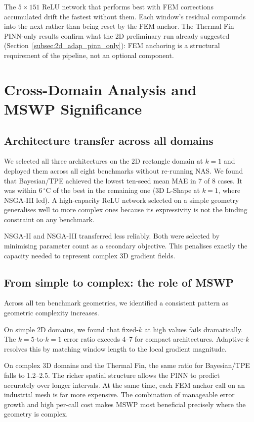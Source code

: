 The $5{\times}151$ ReLU network that performs best with FEM corrections
accumulated drift the fastest without them.
Each window's residual compounds into the next rather than being reset by the
FEM anchor.
The Thermal Fin PINN-only results confirm what the 2D preliminary run already
suggested (Section~\ref{subsec:2d_adap_pinn_only}): FEM anchoring is a
structural requirement of the pipeline, not an optional component.

\section{Cross-Domain Analysis and MSWP Significance}
\label{sec:disc_nas_transfer}

\subsection{Architecture transfer across all domains}

We selected all three architectures on the 2D rectangle domain at $k=1$ and
deployed them across all eight benchmarks without re-running NAS.
We found that Bayesian/TPE achieved the lowest ten-seed mean MAE in 7 of 8 cases.
It was within $6\,^\circ\mathrm{C}$ of the best in the remaining one
(3D L-Shape at $k=1$, where NSGA-III led).
A high-capacity ReLU network selected on a simple geometry generalises well
to more complex ones because its expressivity is not the binding constraint on
any benchmark.

NSGA-II and NSGA-III transferred less reliably.
Both were selected by minimising parameter count as a secondary objective.
This penalises exactly the capacity needed to represent complex 3D gradient
fields.

\subsection{From simple to complex: the role of MSWP}

Across all ten benchmark geometries, we identified a consistent pattern as geometric complexity increases.

On simple 2D domains, we found that fixed-$k$ at high values fails dramatically.
The $k=5$-to-$k=1$ error ratio exceeds 4--7 for compact architectures.
Adaptive-$k$ resolves this by matching window length to the local gradient
magnitude.

On complex 3D domains and the Thermal Fin, the same ratio for Bayesian/TPE
falls to 1.2--2.5.
The richer spatial structure allows the PINN to predict accurately over longer
intervals.
At the same time, each FEM anchor call on an industrial mesh is far more
expensive.
The combination of manageable error growth and high per-call cost makes MSWP
most beneficial precisely where the geometry is complex.

